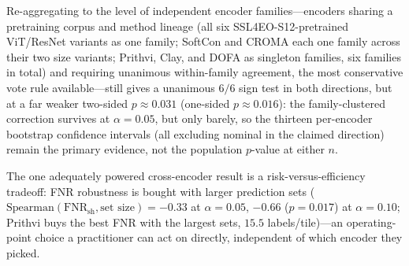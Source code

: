 \documentclass[11pt]{article}
\begin{document}
Re-aggregating to the level of independent encoder families---encoders sharing a pretraining
corpus and method lineage (all six SSL4EO-S12-pretrained ViT/ResNet variants as one family; SoftCon
and CROMA each one family across their two size variants; Prithvi, Clay, and DOFA as singleton
families, six families in total) and requiring unanimous within-family agreement, the most
conservative vote rule available---still gives a unanimous $6/6$ sign test in both directions, but
at a far weaker two-sided $p\approx0.031$ (one-sided $p\approx0.016$): the family-clustered
correction survives at $\alpha{=}0.05$, but only barely, so the thirteen per-encoder bootstrap
confidence intervals (all excluding nominal in the claimed direction) remain the primary evidence,
not the population $p$-value at either $n$.

The one adequately powered cross-encoder result is a risk-versus-efficiency tradeoff: FNR robustness is
bought with larger prediction sets
($\mathrm{Spearman}(\mathrm{FNR}_{\mathrm{sh}},\text{set size})=-0.33$ at $\alpha{=}0.05$, $-0.66$
($p{=}0.017$) at $\alpha{=}0.10$; Prithvi buys the best FNR with the largest sets, $15.5$ labels/tile)---an
operating-point choice a practitioner can act on directly, independent of which encoder they picked.
\end{document}
